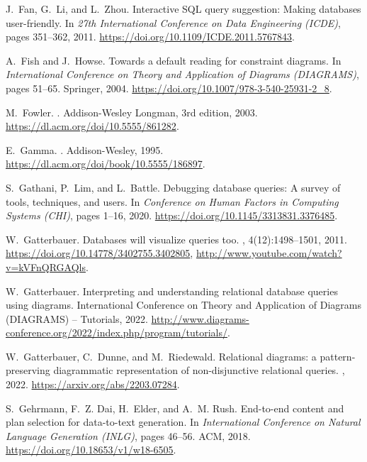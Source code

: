 \documentclass[letterpaper,11pt]{article}
\begin{document}
\begin{thebibliography}{100}
J.~Fan, G.~Li, and L.~Zhou.
\newblock Interactive {SQL} query suggestion: Making databases user-friendly.
\newblock In {\em 27th International Conference on Data Engineering (ICDE)},
  pages 351--362, 2011.
\newblock \url{https://doi.org/10.1109/ICDE.2011.5767843}.

A.~Fish and J.~Howse.
\newblock Towards a default reading for constraint diagrams.
\newblock In {\em International Conference on Theory and Application of
  Diagrams ({DIAGRAMS})}, pages 51--65. Springer, 2004.
\newblock \url{https://doi.org/10.1007/978-3-540-25931-2\_8}.

M.~Fowler.
.
\newblock Addison-Wesley Longman, 3rd edition, 2003.
\newblock \url{https://dl.acm.org/doi/10.5555/861282}.

E.~Gamma.
.
\newblock Addison-Wesley, 1995.
\newblock \url{https://dl.acm.org/doi/book/10.5555/186897}.

S.~Gathani, P.~Lim, and L.~Battle.
\newblock Debugging database queries: {A} survey of tools, techniques, and
  users.
\newblock In {\em Conference on Human Factors in Computing Systems ({CHI})},
  pages 1--16, 2020.
\newblock \url{https://doi.org/10.1145/3313831.3376485}.

W.~Gatterbauer.
\newblock Databases will visualize queries too.
, 4(12):1498--1501, 2011.
\newblock \url{https://doi.org/10.14778/3402755.3402805},
  \url{http://www.youtube.com/watch?v=kVFnQRGAQls}.

W.~Gatterbauer.
\newblock Interpreting and understanding relational database queries using
  diagrams.
\newblock International Conference on Theory and Application of Diagrams
  ({DIAGRAMS}) -- Tutorials, 2022.
\newblock
  \url{http://www.diagrams-conference.org/2022/index.php/program/tutorials/}.

W.~Gatterbauer, C.~Dunne, and M.~Riedewald.
\newblock Relational diagrams: a pattern-preserving diagrammatic representation
  of non-disjunctive relational queries.
, 2022.
\newblock \url{https://arxiv.org/abs/2203.07284}.

S.~Gehrmann, F.~Z. Dai, H.~Elder, and A.~M. Rush.
\newblock End-to-end content and plan selection for data-to-text generation.
\newblock In {\em International Conference on Natural Language Generation
  (INLG)}, pages 46--56. ACM, 2018.
\newblock \url{https://doi.org/10.18653/v1/w18-6505}.


\end{thebibliography}
\end{document}
